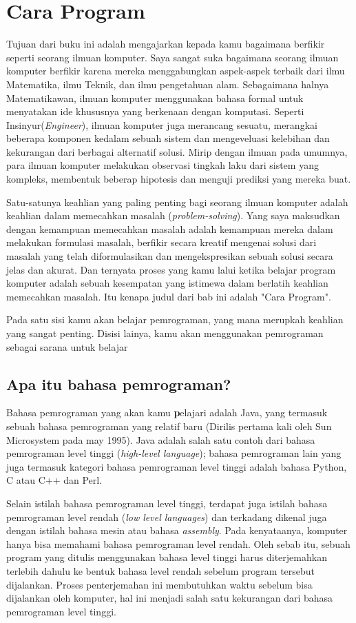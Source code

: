 \chapter{Cara Program}
Tujuan dari buku ini adalah mengajarkan kepada kamu bagaimana berfikir seperti seorang ilmuan komputer. Saya sangat suka bagaimana seorang ilmuan komputer berfikir karena mereka menggabungkan aspek-aspek terbaik dari ilmu Matematika, ilmu Teknik, dan ilmu pengetahuan alam. Sebagaimana halnya Matematikawan, ilmuan komputer menggunakan bahasa formal untuk menyatakan ide khususnya yang berkenaan dengan komputasi. Seperti Insinyur(\textit{Engineer}), ilmuan komputer juga merancang sesuatu, merangkai beberapa komponen kedalam sebuah sistem dan mengeveluasi kelebihan dan kekurangan dari berbagai alternatif solusi. Mirip dengan ilmuan pada umumnya, para ilmuan komputer melakukan observasi tingkah laku dari sistem yang kompleks, membentuk beberap hipotesis dan menguji prediksi yang mereka buat.

Satu-satunya keahlian yang paling penting bagi seorang ilmuan komputer adalah keahlian dalam memecahkan masalah (\textit{problem-solving}). Yang saya maksudkan dengan kemampuan memecahkan masalah adalah kemampuan mereka dalam melakukan formulasi masalah, berfikir secara kreatif mengenai solusi dari masalah yang telah diformulasikan dan mengekspresikan sebuah solusi secara jelas dan akurat.  Dan ternyata proses yang kamu lalui ketika belajar program komputer  adalah sebuah kesempatan yang istimewa  dalam berlatih keahlian memecahkan masalah. Itu kenapa judul dari bab ini adalah "Cara Program".

Pada satu sisi kamu akan belajar pemrograman, yang mana merupkah keahlian yang sangat penting. Disisi lainya, kamu akan menggunakan pemrograman sebagai sarana untuk belajar 

\section{Apa itu bahasa pemrograman?}

Bahasa pemrograman yang akan kamu \textbf pelajari adalah Java, yang termasuk sebuah bahasa pemrograman yang relatif baru (Dirilis pertama kali oleh Sun Microsystem pada may 1995). Java adalah salah satu contoh dari bahasa pemrograman level tinggi (\textit{high-level language}); bahasa pemrograman lain yang juga termasuk kategori bahasa pemrograman level tinggi adalah bahasa Python, C atau C++ dan Perl.

Selain istilah bahasa pemrograman level tinggi, terdapat juga istilah bahasa pemrograman level rendah (\textit{low level languages}) dan terkadang dikenal juga dengan istilah bahasa mesin atau bahasa \textit{assembly}. Pada kenyataanya, komputer hanya bisa memahami bahasa pemrograman level rendah. Oleh sebab itu, sebuah program yang ditulis menggunakan bahasa level tinggi harus diterjemahkan terlebih dahulu ke bentuk bahasa level rendah sebelum program tersebut dijalankan. Proses penterjemahan ini membutuhkan waktu sebelum bisa dijalankan oleh komputer, hal ini menjadi salah satu kekurangan dari bahasa pemrograman level tinggi.

